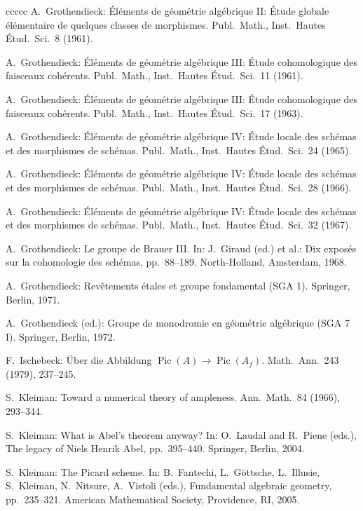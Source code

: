 \documentclass[oneside, 12pt]{amsart}
\theoremstyle{definition}
\theoremstyle{remark}
\begin{document}
\begin{thebibliography}{ccccc}
A.\ Grothendieck:
\'El\'ements de g\'eom\'etrie alg\'ebrique II:
\'Etude globale \'el\'ementaire de quelques classes de morphismes.
Publ.\ Math., Inst.\ Hautes \'Etud.\ Sci.\ 8 (1961).
  
A.\ Grothendieck:
\'El\'ements de g\'eom\'etrie alg\'ebrique III:
\'Etude cohomologique des faisceaux coh\'erents.
Publ.\ Math., Inst.\ Hautes \'Etud.\ Sci.\ 11 (1961).

A.\ Grothendieck:
\'El\'ements de g\'eom\'etrie alg\'ebrique III:
\'Etude cohomologique des faisceaux coh\'erents.
Publ.\ Math., Inst.\ Hautes \'Etud.\ Sci.\  17 (1963).

A.\ Grothendieck:
\'El\'ements de g\'eom\'etrie alg\'ebrique IV: \'Etude locale des
sch\'emas et des morphismes de sch\'emas.
Publ.\ Math., Inst.\ Hautes \'Etud.\ Sci.\   24 (1965).

A.\ Grothendieck:
\'El\'ements de g\'eom\'etrie alg\'ebrique IV: \'Etude locale des
sch\'emas et des morphismes de sch\'emas.
Publ.\ Math., Inst.\ Hautes \'Etud.\ Sci.\  28 (1966).

A.\ Grothendieck:
\'El\'ements de g\'eom\'etrie alg\'ebrique IV: \'Etude locale des
sch\'emas et des morphismes de sch\'emas.
Publ.\ Math., Inst.\ Hautes \'Etud.\ Sci.\   32 (1967).

A.\ Grothendieck:
Le groupe de Brauer III.
In: 
J.\ Giraud (ed.) et al.: Dix expos\'es sur la cohomologie des sch\'emas, pp.\ 88--189.
North-Holland, Amsterdam, 1968.

A.\ Grothendieck:
Rev\^etements \'etales et groupe fondamental (SGA 1).
Springer, Berlin, 1971.

A.\ Grothendieck (ed.):
Groupe de monodromie en g\'eom\'etrie alg\'ebrique (SGA 7 I).
Springer, Berlin, 1972.

F.\ Ischebeck:
\"Uber die Abbildung $\operatorname{Pic}(A)\rightarrow\operatorname{Pic}(A_f)$. 
Math.\ Ann.\ 243 (1979),  237--245.

S.\ Kleiman:
Toward a numerical theory of ampleness.
Ann.\ Math.\  84  (1966), 293--344.

S.\ Kleiman:
What is Abel's theorem anyway? 
In:
O.\ Laudal and R.\ Piene (eds.), The legacy of Niels Henrik Abel, pp.\ 395--440.
Springer, Berlin, 2004.
 
S.\ Kleiman:
The Picard scheme. 
In:
B.\ Fantechi, L.\  G\"ottsche, L.\ Illusie, S.\ Kleiman, N.\  Nitsure, A.\ Vistoli (eds.), 
Fundamental algebraic geometry,
pp.\ 235--321.
American Mathematical Society, Providence, RI, 2005. 


\end{thebibliography}
\end{document}
